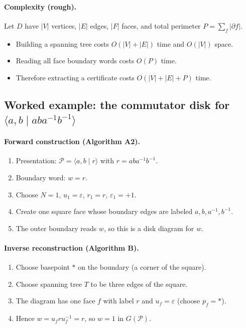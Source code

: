 \documentclass[11pt]{article}
\theoremstyle{definition}
\theoremstyle{plain}
\theoremstyle{remark}
\begin{document}
\paragraph{Complexity (rough).}\cite{lyndonschupp1977,cormen2009}
Let $D$ have $|V|$ vertices, $|E|$ edges, $|F|$ faces, and total perimeter $P=\sum_f|\partial f|$.
\begin{itemize}[leftmargin=2em]
\item Building a spanning tree costs $O(|V|+|E|)$ time and $O(|V|)$ space.
\item Reading all face boundary words costs $O(P)$ time.
\item Therefore extracting a certificate costs $O(|V|+|E|+P)$ time.
\end{itemize}
\subsection*{Worked example: the commutator disk for $\langle a,b\mid aba^{-1}b^{-1}\rangle$}
\paragraph{Forward construction (Algorithm A2).}
\begin{enumerate}[leftmargin=2.2em]
\item Presentation: $\mathcal P=\langle a,b\mid r\rangle$ with $r=aba^{-1}b^{-1}$.
\item Boundary word: $w=r$.
\item Choose $N=1$, $u_1=\varepsilon$, $r_1=r$, $\varepsilon_1=+1$.
\item Create one square face whose boundary edges are labeled $a,b,a^{-1},b^{-1}$.
\item The outer boundary reads $w$, so this is a disk diagram for $w$.
\end{enumerate}

\paragraph{Inverse reconstruction (Algorithm B).}
\begin{enumerate}[leftmargin=2.2em]
\item Choose basepoint $*$ on the boundary (a corner of the square).
\item Choose spanning tree $T$ to be three edges of the square.
\item The diagram has one face $f$ with label $r$ and $u_f=\varepsilon$ (choose $p_f=*$).
\item Hence $w=u_f r u_f^{-1}=r$, so $w=1$ in $G(\mathcal P)$.
\end{enumerate}
\end{document}
